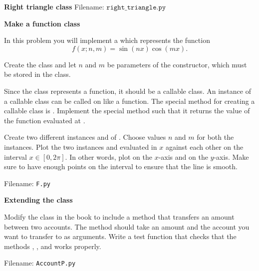\begin{Problem}{\textbf{Right triangle class}}
Filename: $\texttt{right\_triangle.py}$
\end{Problem}


\begin{Problem}{\textbf{Make a function class}}

In this problem you will implement a  which represents the function
\begin{equation*}
    f(x; n, m) =  \sin(n x) \cos(m x).
\end{equation*}

Create the class and let $n$ and $m$ be parameters of the constructor, which must be stored in the class.  


Since the class represents a function, it should be a callable class. An instance of a callable class can be called on like a function. The special method for creating a callable class is . Implement the special method  such that it returns the value of the function evaluated at . 

Create two different instances  and  of . Choose values $n$ and $m$ for both the instances. Plot the two instances  and  evaluated in $x$ against each other on the interval $x \in [0, 2 \pi]$. In other words, plot  on the $x$-axis and  on the $y$-axis. Make sure to have enough points on the interval to ensure that the line is smooth.


Filename: \texttt{F.py}
\end{Problem}

\begin{Problem}{\textbf{Extending the  class}} \label{prob75}

\noindent Modify the class  in the book to include a method  that transfers an amount between two accounts. The method should take an amount and the account you want to transfer to as arguments. Write a test function that checks that the methods , ,  and  works properly.

Filename: \texttt{AccountP.py}

\end{Problem}

